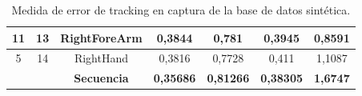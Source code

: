 \begin{table}[h]
\begin{tabular}{|c|c|c|c|c|c|c|}
11       & 13        & RightForeArm       & 0,3844                                                       & 0,781                                                        & 0,3945                                                                  & 0,8591                                                                  \\ \hline
5        & 14        & RightHand          & 0,3816                                                       & 0,7728                                                       & 0,411                                                                   & 1,1087                                                                  \\ \hline
         &           & \textbf{Secuencia} & \textbf{0,35686}                                             & \textbf{0,81266}                                             & \textbf{0,38305}                                                        & \textbf{1,6747}                                                         \\ \hline
\end{tabular}
\caption{Medida de error de tracking en captura de la base de datos sintética.}
\label{tablaerrortrack}
\end{table}

